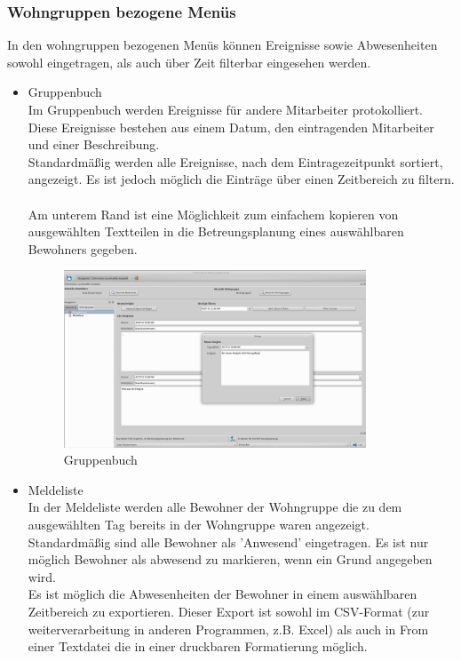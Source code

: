 \subsubsection{Wohngruppen bezogene Menüs}
In den wohngruppen bezogenen Menüs können Ereignisse sowie Abwesenheiten sowohl eingetragen, als auch über Zeit filterbar eingesehen werden.
\begin{itemize}
	\item Gruppenbuch\mbox{}\\
	\noindent
	Im Gruppenbuch werden Ereignisse für andere Mitarbeiter protokolliert. Diese Ereignisse bestehen aus einem Datum, den eintragenden Mitarbeiter und einer Beschreibung.\\Standardmäßig werden alle Ereignisse, nach dem Eintragezeitpunkt sortiert, angezeigt. Es ist jedoch möglich die Einträge über einen Zeitbereich zu filtern.\\\\Am unterem Rand ist eine Möglichkeit zum einfachem kopieren von ausgewählten Textteilen in die Betreungsplanung eines auswählbaren Bewohners gegeben.
	\begin{figure}[h]
		\begin{center}
			\includegraphics[keepaspectratio=true, width=0.85\textwidth]{pics/client_ereignis.png}
			\caption{Gruppenbuch}
		\end{center}
	\end{figure}
	\FloatBarrier
	\newpage
	\item Meldeliste\mbox{}\\
	\noindent
	In der Meldeliste werden alle Bewohner der Wohngruppe die zu dem ausgewählten Tag bereits in der Wohngruppe waren angezeigt. Standardmäßig sind alle Bewohner als 'Anwesend' eingetragen. Es ist nur möglich Bewohner als abwesend zu markieren, wenn ein Grund angegeben wird.\\ Es ist möglich die Abwesenheiten der Bewohner in einem auswählbaren Zeitbereich zu exportieren. Dieser Export ist sowohl im CSV-Format (zur weiterverarbeitung in anderen Programmen, z.B. Excel) als auch in From einer Textdatei die in einer druckbaren Formatierung möglich.

\end{itemize}
